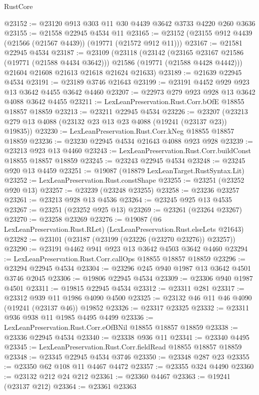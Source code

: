 \begin{lexlean}{RustCore}
\begin{coremodule}
@23152 := @23120 @913 @303 @11 @30 @4439 @3642 @3733 @4220 @260 @3636
@23155 := @21558 @22945 @4534 @11
@23165 := @23152 (@23155 @912 @4439 (@21566 (@21567 @4439)) (@19771 (@21572 @912 @11)))
@23167 := @21581 @22945 @4534
@23187 := @23109
    (@23118
      (@23142
        (@23165 @23167 @21586 (@19771 (@21588 @4434 @3642)))
        @21586
        (@19771 (@21588 @4428 @4442)))
      @21604
      @21608
      @21613
      @21618
      @21624
      @21633)
@23189 := @21639 @22945 @4534
@23191 := @23189 @3746 @21643
@23199 := @23191 @4452 @929 @923 @13 @3642 @4455 @3642 @4460
@23207 := @22973 @279 @923 @928 @13 @3642 @4088 @3642 @4455
@23211 := LexLeanPreservation.Rust.Corr.bOfE @18855 @18857 @18859
@23213 := @23211 @22945 @4534
@23226 := @23207 (@23213 @279 @13 @4088 (@23132 @23 @13 @23 @4088 (@19241 (@23137 @23)) @19835))
@23230 := LexLeanPreservation.Rust.Corr.kNeg @18855 @18857 @18859
@23236 := @23230 @22945 @4534 @21643 @4088 @923 @928
@23239 := @23213 @923 @13 @4460
@23243 := LexLeanPreservation.Rust.Corr.buildConst @18855 @18857 @18859
@23245 := @23243 @22945 @4534
@23248 := @23245 @920 @13 @4459
@23251 := @19087 (@18879 LexLeanTarget.RustSyntax.Lit)
@23252 := LexLeanPreservation.Rust.constShape
@23255 := @23251 (@23252 @920 @13)
@23257 := @23239 (@23248 @23255)
@23258 := @23236 @23257
@23261 := @23213 @928 @13 @4536
@23264 := @23245 @925 @13 @4535
@23267 := @23251 (@23252 @925 @13)
@23269 := @23261 (@23264 @23267)
@23270 := @23258 @23269
@23276 := @19087 (@6 LexLeanPreservation.Rust.RLet) (LexLeanPreservation.Rust.elseLets @21643)
@23282 := @23101 (@23187 (@23199 (@23226 (@23270 @23276)) @23257))
@23290 := @23191 @4462 @941 @923 @13 @3642 @4503 @3642 @4460
@23294 := LexLeanPreservation.Rust.Corr.callOps @18855 @18857 @18859
@23296 := @23294 @22945 @4534
@23304 := @23296 @245 @940 @1987 @13 @3642 @4501 @3746 @2045
@23306 := @19806 @22945 @4534
@23309 := @23306 @940 @1987 @4501
@23311 := @19815 @22945 @4534
@23312 := @23311 @281
@23317 := @23312 @939 @11 @1986 @4090 @4500
@23325 := @23132 @46 @11 @46 @4090 (@19241 (@23137 @46)) @19852
@23326 := @23317 @23325
@23332 := @23311 @936 @938 @11 @1985 @4495 @4499
@23336 := LexLeanPreservation.Rust.Corr.eOfBNil @18855 @18857 @18859
@23338 := @23336 @22945 @4534
@23340 := @23338 @936 @11
@23341 := @23340 @4495
@23345 := LexLeanPreservation.Rust.Corr.fieldRead @18855 @18857 @18859
@23348 := @23345 @22945 @4534 @3746
@23350 := @23348 @287 @23
@23355 := @23350 @62 @108 @11 @4467 @4472
@23357 := @23355 @324 @4490
@23360 := @23132 @212 @24 @212
@23361 := @23360 @4467
@23363 := @19241 (@23137 @212)
@23364 := @23361 @23363

\end{coremodule}
\end{lexlean}
